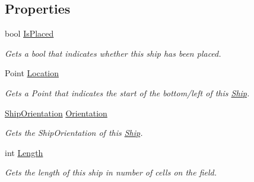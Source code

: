 \subsection*{Properties}
\begin{DoxyCompactItemize}
\item 
\hypertarget{class_m_b_c_1_1_core_1_1_ship_a9a7f4e721f2d4cd9391e2bc633d3ceb2}{bool \hyperlink{class_m_b_c_1_1_core_1_1_ship_a9a7f4e721f2d4cd9391e2bc633d3ceb2}{Is\-Placed}}\label{class_m_b_c_1_1_core_1_1_ship_a9a7f4e721f2d4cd9391e2bc633d3ceb2}

\begin{DoxyCompactList}\small\item\em Gets a bool that indicates whether this ship has been placed.\end{DoxyCompactList}\item 
\hypertarget{class_m_b_c_1_1_core_1_1_ship_ac2b6713dd5e22c092ec5f772379d1c78}{Point \hyperlink{class_m_b_c_1_1_core_1_1_ship_ac2b6713dd5e22c092ec5f772379d1c78}{Location}}\label{class_m_b_c_1_1_core_1_1_ship_ac2b6713dd5e22c092ec5f772379d1c78}

\begin{DoxyCompactList}\small\item\em Gets a Point that indicates the start of the bottom/left of this \hyperlink{class_m_b_c_1_1_core_1_1_ship}{Ship}.\end{DoxyCompactList}\item 
\hypertarget{class_m_b_c_1_1_core_1_1_ship_afcd2ca11e40556c99330a4aa0821244a}{\hyperlink{namespace_m_b_c_1_1_core_ae989f577ccd976664aa442c2cda4d12f}{Ship\-Orientation} \hyperlink{class_m_b_c_1_1_core_1_1_ship_afcd2ca11e40556c99330a4aa0821244a}{Orientation}}\label{class_m_b_c_1_1_core_1_1_ship_afcd2ca11e40556c99330a4aa0821244a}

\begin{DoxyCompactList}\small\item\em Gets the Ship\-Orientation of this \hyperlink{class_m_b_c_1_1_core_1_1_ship}{Ship}.\end{DoxyCompactList}\item 
\hypertarget{class_m_b_c_1_1_core_1_1_ship_a032a96397bef51321cec9d2ec370ffca}{int \hyperlink{class_m_b_c_1_1_core_1_1_ship_a032a96397bef51321cec9d2ec370ffca}{Length}}\label{class_m_b_c_1_1_core_1_1_ship_a032a96397bef51321cec9d2ec370ffca}

\begin{DoxyCompactList}\small\item\em Gets the length of this ship in number of cells on the field.\end{DoxyCompactList}\end{DoxyCompactItemize}


